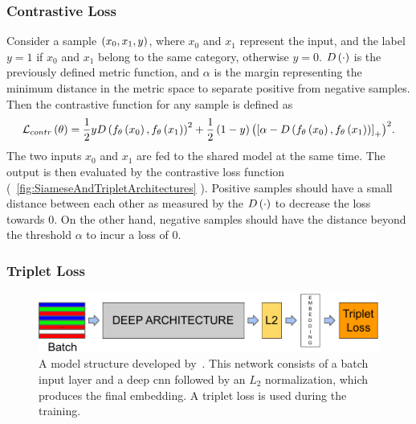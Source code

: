 \subsubsection{Contrastive Loss}

Consider a sample $\left( {x_0, x_1, y} \right)$, where $x_0$ and $x_1$ represent the input, and the label $y = 1$ if $x_0$ and $x_1$ belong to the same category, otherwise $y = 0$. ${D} \left( \cdot \right)$ is the previously defined metric function, and $\alpha$ is the margin representing the minimum distance in the metric space to separate positive from negative samples. Then the contrastive function for any sample is defined as~\cite{hadsell2006dimreduction}
\begin{equation}
    \label{eq:ContrastiveLoss}
    {\mathcal{L}_{contr}} \left( \theta \right) =
    \frac{1}{2}y
    {{D} \left( {f_\theta} \left( x_0 \right), {f_\theta} \left( x_1 \right) \right)}^2 +
    \frac{1}{2}
    \left( {1 - y} \right) {\left( {
            \left[ {\alpha - {D} \left( {f_\theta} \left( x_0 \right), {f_\theta} \left( x_1 \right) \right)} \right]_{+}} \right)}^2.
\end{equation}
The two inputs $x_0$ and $x_1$ are fed to the shared model at the same time. The output is then evaluated by the contrastive loss function (\figstr{}~\ref{fig:SiameseAndTripletArchitectures} ). Positive samples should have a small distance between each other as measured by the ${D} \left( \cdot \right)$ to decrease the loss towards $0$. On the other hand, negative samples should have the distance beyond the threshold $\alpha$ to incur a loss of $0$.

\subsubsection{Triplet Loss}

\begin{figure}[t]
    \centerline{\includegraphics[width=0.7\linewidth]{figures/theoretical_foundations/triplet_loss_model_structure.pdf}}
    \caption[Triplet loss architecture]{A model structure developed by~\cite{schroff2015facenet}. This network consists of a batch input layer and a deep \gls{cnn} followed by an $L_2$ normalization, which produces the final embedding. A triplet loss is used during the training. }
    \label{fig:TripletLossModelStructure}
\end{figure}

